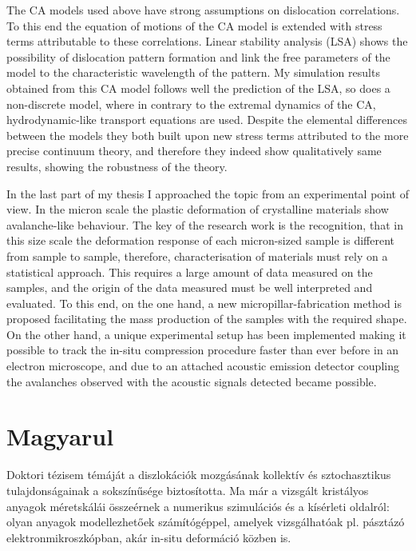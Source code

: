 The CA models used above have strong assumptions on dislocation correlations. To this end the equation of motions of the CA model is extended with stress terms attributable to these correlations. Linear stability analysis (LSA) shows the possibility of dislocation pattern formation and link the free parameters of the model to the characteristic wavelength of the pattern. My simulation results obtained from this CA model follows well the prediction of the LSA, so does a non-discrete model, where in contrary to the extremal dynamics of the CA, hydrodynamic-like transport equations are used. Despite the elemental differences between the models they both built upon new stress terms attributed to the more precise continuum theory, and therefore they indeed show qualitatively same results, showing the robustness of the theory.

In the last part of my thesis I approached the topic from an experimental point of view. In the micron scale the plastic deformation of crystalline materials show avalanche-like behaviour. The key of the research work is the recognition, that in this size scale the deformation response of each micron-sized sample is different from sample to sample, therefore, characterisation of materials must rely on a statistical approach. This requires a large amount of data measured on the samples, and the origin of the data measured must be well interpreted and evaluated. To this end, on the one hand, a new micropillar-fabrication method is proposed facilitating the mass production of the samples with the required shape. On the other hand, a unique experimental setup has been implemented making it possible to track the in-situ compression procedure faster than ever before in an electron microscope, and due to an attached acoustic emission detector coupling the avalanches observed with the acoustic signals detected became possible.

\section*{Magyarul}
Doktori tézisem témáját a diszlokációk mozgásának kollektív és sztochasztikus tulajdonságainak a sokszínűsége biztosította. Ma már a vizsgált kristályos anyagok méretskálái összeérnek a numerikus szimulációs és a kísérleti oldalról: olyan anyagok modellezhetőek számítógéppel, amelyek vizsgálhatóak pl. pásztázó elektronmikroszkópban, akár in-situ deformáció közben is.

